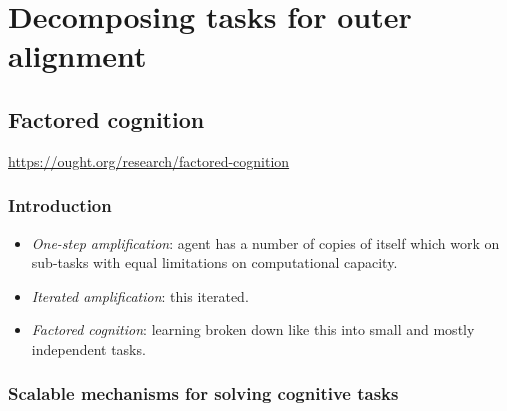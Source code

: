 
\chapter{Decomposing tasks for outer alignment}

\section{Factored cognition}

\url{https://ought.org/research/factored-cognition}


\subsection{Introduction}

\begin{itemize}
    \item \emph{One-step amplification}: agent has a number of copies of itself which work on sub-tasks with equal limitations on computational capacity.
    \item \emph{Iterated amplification}: this iterated.
    \item \emph{Factored cognition}: learning broken down like this into small and mostly independent tasks.
\end{itemize}


\subsection{Scalable mechanisms for solving cognitive tasks}

